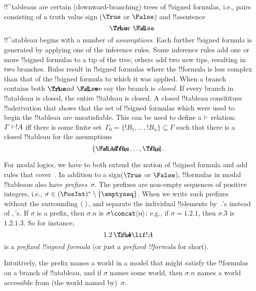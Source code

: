 \documentclass[../../../include/open-logic-section]{subfiles}
\begin{document}


!!^{tableau}s are certain (downward-branching) trees of !!{signed
  formula}s, i.e., pairs consisting of a truth value sign ($\True$ or
$\False$) and !!a{sentence}
\[
\sFmla{\True}{!A} \text{ or } \sFmla{\False}{!A}.
\]
!!^a{tableau} begins with a number of \emph{assumptions}. Each further
!!{signed formula} is generated by applying one of the inference
rules. Some inference rules add one or more !!{signed formula}s to a
tip of the tree; others add two new tips, resulting in two branches.
Rules result in !!{signed formula}s where the !!{formula} is
less complex than that of the !!{signed formula} to which it was
applied. When a branch contains both $\sFmla{\True}{!A}$ and
$\sFmla{\False}{!A}$, we say the branch is \emph{closed}. If every
branch in !!a{tableau} is closed, the entire !!{tableau} is closed. A
closed !!{tableau} consititues !!a{derivation} that shows that the set
of !!{signed formula}s which were used to begin the !!{tableau} are
unsatisfiable.  This can be used to define a $\Proves$ relation:
$\Gamma \Proves !A$ iff there is some finite set~$\Gamma_0 = \{!B_1,
\dots, !B_n\} \subseteq \Gamma$ such that there is a closed
!!{tableau} for the assumptions
\[
\{\sFmla{\False}{!A}, \sFmla{\True}{!B_1}, \dots, \sFmla{\True}{!B_n}\}.
\]

For modal logics, we have to both extend the notion of !!{signed
formula} and add rules that
cover~. In addition to a sign($\True$ or
$\False$), !!{formula}s in modal !!{tableau}s also have
\emph{prefixes}~$\sigma$. The prefixes are non-empty sequences of
positive integers, i.e., $\sigma \in (\PosInt)^* \setminus
\{\emptyseq\}$. When we write such prefixes without the surrounding
$\langle \  \rangle$, and separate the individual !!{element}s by~$.$'s
instead of $,$'s. If $\sigma$ is a prefix, then $\sigma.n$ is $\sigma
\concat \tuple{n}$; e.g., if $\sigma = 1.2.1$, then $\sigma.3$ is
$1.2.1.3$. So for instance,
\[
\sFmla{\True}{\Box !A \lif !A}[1.2]
\]
is a \emph{prefixed !!{signed formula}} (or just a \emph{prefixed
  !!{formula}} for short).

Intuitively, the prefix names a world in a model that might satisfy
the !!{formula}s on a branch of !!a{tableau}, and if $\sigma$ names
some world, then $\sigma.n$ names a world accessible from (the world
named by)~$\sigma$.
\end{document}
